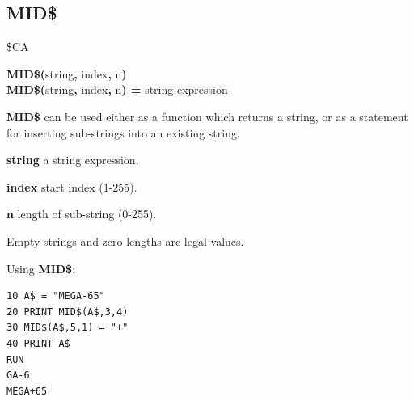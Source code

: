 \subsection{MID\$}
\begin{description}[leftmargin=2cm,style=nextline]
\item [Token:] \$CA
\item [Format:] {\bf MID\$(}string{\bf,} index{\bf,} n{\bf)} \\
                {\bf MID\$(}string{\bf,} index{\bf,} n{\bf) =} string expression
\item [Usage:]  {\bf MID\$} can be used either as a function
                which returns a string, or as a statement for
                inserting sub-strings into an existing string.

               {\bf string} a string expression.

               {\bf index} start index (1-255).

               {\bf n} length of sub-string (0-255).

\item [Remarks:] Empty strings and zero lengths are legal values.

\item [Example:] Using {\bf MID\$}:
\begin{tcolorbox}[colback=black,coltext=white]
\verbatimfont{\codefont}
\begin{verbatim}
10 A$ = "MEGA-65"
20 PRINT MID$(A$,3,4)
30 MID$(A$,5,1) = "+"
40 PRINT A$
RUN
GA-6
MEGA+65
\end{verbatim}
\end{tcolorbox}
\end{description}


\newpage

